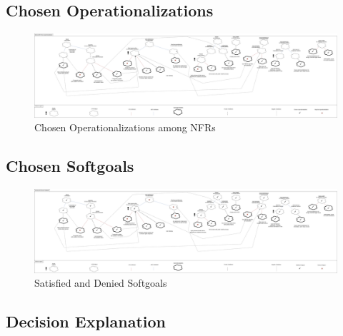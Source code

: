 \documentclass{VUMIFPSkursinis}
\begin{document}
\begin{landscape}
\subsection{Chosen Operationalizations}
	\begin{figure}[H]
		\center
		\includegraphics[scale=0.2]{img/Operationalization}
		\caption{Chosen Operationalizations among NFRs} %
		\label{img:kurimoProcesas}
	\end{figure}
	
	
\subsection{Chosen Softgoals}
	\begin{figure}[H]
		\center
		\includegraphics[scale=0.2]{img/Satisfied-Goals}
		\caption{Satisfied and Denied Softgoals} %
		\label{img:kurimoProcesas}
	\end{figure}
\end{landscape}
\subsection{Decision Explanation}
\end{document}
